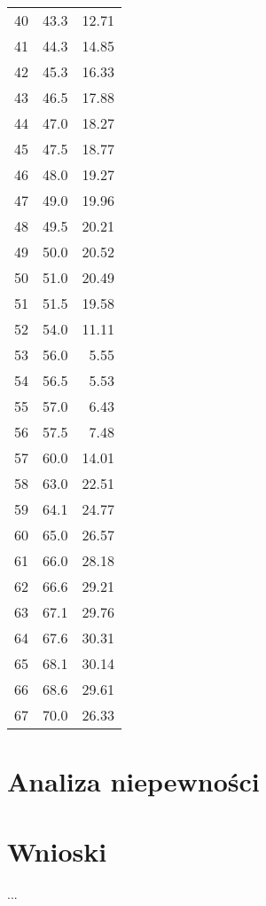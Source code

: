 \documentclass[a4paper,10pt]{article}
\begin{document}
\begin{tabular}{lrr}
40 &  43.3 &  12.71 \\
41 &  44.3 &  14.85 \\
42 &  45.3 &  16.33 \\
43 &  46.5 &  17.88 \\
44 &  47.0 &  18.27 \\
45 &  47.5 &  18.77 \\
46 &  48.0 &  19.27 \\
47 &  49.0 &  19.96 \\
48 &  49.5 &  20.21 \\
49 &  50.0 &  20.52 \\
50 &  51.0 &  20.49 \\
51 &  51.5 &  19.58 \\
52 &  54.0 &  11.11 \\
53 &  56.0 &   5.55 \\
54 &  56.5 &   5.53 \\
55 &  57.0 &   6.43 \\
56 &  57.5 &   7.48 \\
57 &  60.0 &  14.01 \\
58 &  63.0 &  22.51 \\
59 &  64.1 &  24.77 \\
60 &  65.0 &  26.57 \\
61 &  66.0 &  28.18 \\
62 &  66.6 &  29.21 \\
63 &  67.1 &  29.76 \\
64 &  67.6 &  30.31 \\
65 &  68.1 &  30.14 \\
66 &  68.6 &  29.61 \\
67 &  70.0 &  26.33 \\
\bottomrule
\end{tabular}
\section{Analiza niepewności}

\section{Wnioski}
\paragraph{}...
\end{document}
